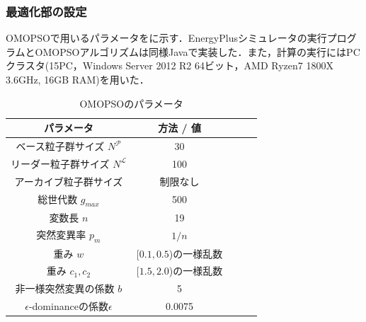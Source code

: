 \subsubsection{最適化部の設定}
OMOPSOで用いるパラメータをに示す．EnergyPlusシミュレータの実行プログラムとOMOPSOアルゴリズムは同様Javaで実装した．また，計算の実行にはPCクラスタ(15PC，Windows Server 2012 R2 64ビット，AMD Ryzen7 1800X 3.6GHz, 16GB RAM)を用いた．

\begin{table}[ht]
    {\small
        \begin{center}
            \caption{OMOPSOのパラメータ}
            \label{tab::robust_param_omopso}
            \begin{tabular}{c|cccc}
                \hline
                パラメータ                             & 方法 / 値              \\
                \hline \hline
                ベース粒子群サイズ $N^{\mathcal{P}}$   & 30                     \\
                リーダー粒子群サイズ $N^{\mathcal{L}}$ & 100                    \\
                アーカイブ粒子群サイズ                 & 制限なし               \\
                総世代数 $g_{max}$                     & 500                    \\
                変数長 $n$                             & 19                     \\
                突然変異率 $p_m$                       & $1/n$                  \\
                重み $w$                               & [$0.1, 0.5$)の一様乱数 \\
                重み $c_1, c_2$                        & [$1.5, 2.0$)の一様乱数 \\
                非一様突然変異の係数 $b$               & 5 \cite{Esquivel03}    \\
                $\epsilon$-dominanceの係数$\epsilon$   & 0.0075                 \\
                \hline
            \end{tabular}
        \end{center}
    }
\end{table}

